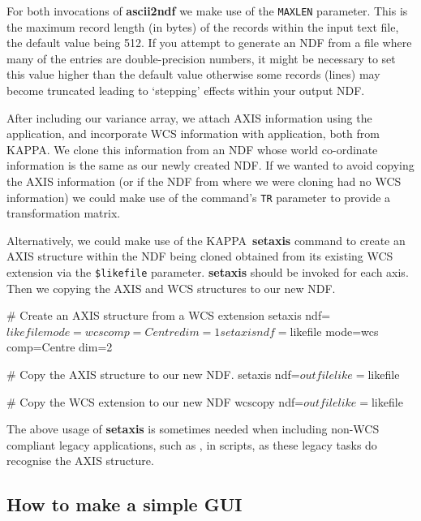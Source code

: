 \documentclass[twoside,11pt]{starlink}
\providecommand{\KAPPA}{{\footnotesize KAPPA}\normalsize}
\begin{document}
For both invocations of \textbf{ascii2ndf} we make use of the \texttt{MAXLEN}
parameter.  This is the maximum record length (in bytes) of the records
within the input text file, the default value being 512.  If you
attempt to generate an NDF from a file where many of the entries are
double-precision numbers, it might be necessary to set this value
higher than the default value otherwise some records (lines) may
become truncated leading to `stepping' effects within your output
NDF.

After including our variance array, we attach AXIS information using
the  application, and incorporate WCS
information with  application, both from
\KAPPA.  We clone this information from an NDF whose world co-ordinate
information is the same as our newly created NDF.  If we wanted to
avoid copying the AXIS information (or if the NDF from where we were
cloning had no WCS information) we could make use of the
 command's \texttt{TR} parameter to provide
a transformation matrix.

\label{sc16_wcs2axis}
Alternatively, we could make use of the \KAPPA\ \textbf{setaxis} command
to create an AXIS structure within the NDF being cloned obtained from
its existing WCS extension via the
\verb+$likefile+ parameter.  \textbf{setaxis} should be invoked for each
axis.  Then we copying the AXIS and WCS structures to our new NDF.

\begin{small}
\begin{terminalv}
# Create an AXIS structure from a WCS extension
setaxis ndf=${likefile} mode=wcs comp=Centre dim=1
setaxis ndf=${likefile} mode=wcs comp=Centre dim=2

# Copy the AXIS structure to our new NDF.
setaxis ndf=${outfile} like=${likefile}

# Copy the WCS extension to our new NDF
wcscopy ndf=${outfile} like=${likefile}
\end{terminalv}
\end{small}

The above usage of \textbf{setaxis} is sometimes needed when including non-WCS
compliant legacy applications, such as
, in scripts, as these legacy tasks do
recognise the AXIS structure.

\subsection{How to make a simple GUI\label{sc16_xdialog}}
\end{document}

